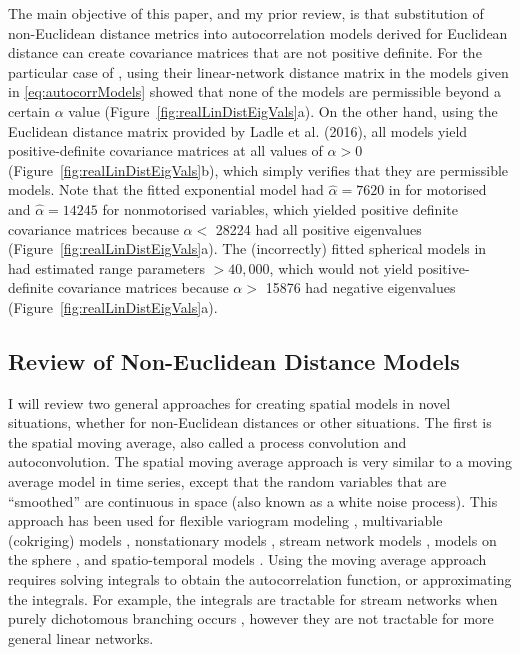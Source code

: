 \documentclass[11pt, titlepage]{article}\usepackage[]{graphicx}\usepackage[]{color}
\begin{document}
\begin{spacing}{1.9}
\begin{flushleft}
The main objective of this paper, and my prior review, is that substitution of non-Euclidean distance metrics into autocorrelation models derived for Euclidean distance can create covariance matrices that are not positive definite. For the particular case of \citet{Ladl:Avga:Whea:Boyc:pred:2016}, using their linear-network distance matrix in the models given in \ref{eq:autocorrModels} showed that none of the models are permissible beyond a certain $\alpha$ value (Figure~\ref{fig:realLinDistEigVals}a).  On the other hand, using the Euclidean distance matrix provided by Ladle et al. (2016), all models yield positive-definite covariance matrices at all values of $\alpha > 0$ (Figure~\ref{fig:realLinDistEigVals}b), which simply verifies that they are permissible models.  Note that the fitted exponential model had $\hat{\alpha} = 7620$ in \citet{Ladl:Avga:Whea:Boyc:pred:2016} for motorised and $\hat{\alpha} = 14245$ for nonmotorised variables, which yielded positive definite covariance matrices because $\alpha <$ 28224 had all positive eigenvalues (Figure~\ref{fig:realLinDistEigVals}a). The (incorrectly) fitted spherical models in \citet{Ladl:Avga:Whea:Boyc:pred:2016} had estimated range parameters $>40,000$, which would not yield positive-definite covariance matrices because $\alpha >$ 15876 had negative eigenvalues (Figure~\ref{fig:realLinDistEigVals}a).

\subsection*{Review of Non-Euclidean Distance Models}

I will review two general approaches for creating spatial models in novel situations, whether for non-Euclidean distances or other situations.  The first is the spatial moving average, also called a process convolution and autoconvolution.  The spatial moving average approach is very similar to a moving average model in time series, except that the random variables that are ``smoothed'' are continuous in space (also known as a white noise process).  This approach has been used for flexible variogram modeling \citep{Barr:Ver:blac:1996}, multivariable (cokriging) models \citep{Ver:Barr:cons:1998,Ver:Cres:Barr:flex:2004}, nonstationary models \citep{Higd:proc:1998,Higd:Swal:Kern:non-:1999}, stream network models \citep{Ver:Pete:Theo:spat:2006, Cres:Frey:Harc:Smit:spat:2006, Ver:Pete:Move:2010}, models on the sphere \citep{Gnei:stri:2013}, and spatio-temporal models \citep{Wikl:kern:2002,Conn:John:Ver:spat:2015}. Using the moving average approach requires solving integrals to obtain the autocorrelation function, or approximating the integrals. For example, the integrals are tractable for stream networks when purely dichotomous branching occurs \citep{Ver:Pete:Theo:spat:2006}, however they are not tractable for more general linear networks. 


\end{flushleft}
\end{spacing}
\end{document}
